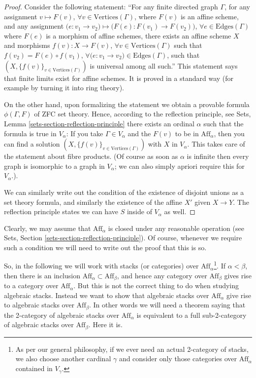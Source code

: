 \begin{proof}
Consider the following statement: ``For any finite directed graph $\Gamma$,
for any assignment $v \mapsto F(v)$, $\forall v\in \text{Vertices}(\Gamma)$,
where $F(v)$ is an affine scheme, and any assignment
$\big(e : v_1 \to v_2\big) \mapsto \big(F(e) : F(v_1) \to F(v_2)\big)$,
$\forall e \in \text{Edges}(\Gamma)$ where $F(e)$ is a morphism of affine
schemes, there exists an affine scheme $X$ and morphisms $f(v) : X \to F(v)$,
$\forall v\in \text{Vertices}(\Gamma)$ such that $f(v_2) = F(e) \circ f(v_1)$,
$\forall \big(e : v_1 \to v_2\big) \in \text{Edges}(\Gamma)$, such that
$(X, \{f(v)\}_{v\in \text{Vertices}(\Gamma)})$ is universal among all such.''
This statement says that finite limits exist for affine schemes. It is
proved in a standard way (for example by turning it into ring theory).

\medskip\noindent
On the other hand, upon formalizing the statement we obtain a provable
formula $\phi(\Gamma, F)$ of ZFC set theory. Hence, according to the reflection
principle, see Sets, Lemma \ref{sets-section-reflection-principle}
there exists an ordinal $\alpha$ such that the formula is true in
$V_\alpha$: If you take $\Gamma \in V_\alpha$ and the $F(v)$ to be in
$\text{Aff}_\alpha$, then you can find a solution
$(X, \{f(v)\}_{v\in \text{Vertices}(\Gamma)})$
with $X$ in $V_\alpha$. This takes care of the statement about fibre 
products. (Of course as soon as $\alpha$ is infinite then every
graph is isomorphic to a graph in $V_\alpha$; we can also simply apriori
require this for $V_\alpha$.).

\medskip\noindent
We can similarly write out the condition of the existence of disjoint unions
as a set theory formula, and similarly the existence of the affine $X'$
given $X \to Y$. The reflection principle states we can have $S$ inside of
$V_\alpha$ as well.
\end{proof}

\noindent
Clearly, we may assume that $\text{Aff}_\alpha$ is closed under any reasonable
operation (see Sets, Section \ref{sets-section-reflection-principle}).
Of course, whenever we require such a condition we will need to write out
the proof that this is so.

\medskip\noindent
So, in the following we will work with stacks (or categories) over
$\text{Aff}_\alpha$\footnote{As per our general philosophy, if we ever need
an actual 2-category of stacks, we also choose another cardinal $\gamma$ and
consider only those categories over $\text{Aff}_\alpha$ contained in
$V_\gamma$.}. If $\alpha < \beta$, then there is an inclusion
$\text{Aff}_\alpha \subset \text{Aff}_\beta$, and hence any category
over $\text{Aff}_\beta$ gives rise to a category over $\text{Aff}_\alpha$.
But this is not the correct thing to do when studying algebraic stacks.
Instead we want to show that algebraic stacks over $\text{Aff}_\alpha$
give rise to algebraic stacks over $\text{Aff}_\beta$. In other words we will
need a theorem saying that the 2-category of algebraic
stacks over $\text{Aff}_\alpha$ is equivalent to a full sub-2-category of
algebraic stacks over $\text{Aff}_\beta$. Here it is.

